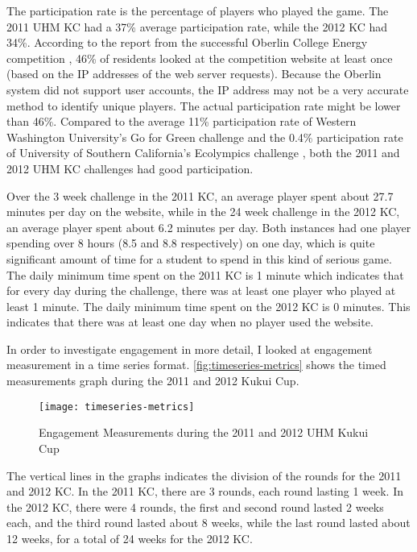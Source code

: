The participation rate is the percentage of players who played the game. The 2011 UHM KC had a 37\% average participation rate, while the 2012 KC had 34\%. According to the report from the successful Oberlin College Energy competition \cite{petersen-dorm-energy-reduction}, 46\% of residents looked at the competition website at least once (based on the IP addresses of the web server requests). Because the Oberlin system did not support user accounts, the IP address may not be a very accurate method to identify unique players. The actual participation rate might be lower than 46\%. Compared to the average 11\% participation rate of Western Washington University's Go for Green challenge \cite{Mauney-thesis} and the 0.4\% participation rate of University of Southern California's Ecolympics challenge \cite{Sintov2011}, both the 2011 and 2012 UHM KC challenges had good participation. 

Over the 3 week challenge in the 2011 KC, an average player spent about 27.7 minutes per day on the website, while in the 24 week challenge in the 2012 KC, an average player spent about 6.2 minutes per day. Both instances had one player spending over 8 hours (8.5 and 8.8 respectively) on one day, which is quite significant amount of time for a student to spend in this kind of serious game. The daily minimum time spent on the 2011 KC is 1 minute which indicates that for every day during the challenge, there was at least one player who played at least 1 minute. The daily minimum time spent on the 2012 KC is 0 minutes. This indicates that there was at least one day when no player used the website.

In order to investigate engagement in more detail, I looked at engagement measurement in a time series format. \autoref{fig:timeseries-metrics} shows the timed measurements graph during the 2011 and 2012 Kukui Cup.

\begin{figure}[ht!]
  \center
  \texttt{[image: timeseries-metrics]}
  \caption{Engagement Measurements during the 2011 and 2012 UHM Kukui Cup}
  \label{fig:timeseries-metrics}
\end{figure}

The vertical lines in the graphs indicates the division of the rounds for the 2011 and 2012 KC. In the 2011 KC, there are 3 rounds, each round lasting 1 week. In the 2012 KC, there were 4 rounds, the first and second round lasted 2 weeks each, and the third round lasted about 8 weeks, while the last round lasted about 12 weeks, for a total of 24 weeks for the 2012 KC. 


